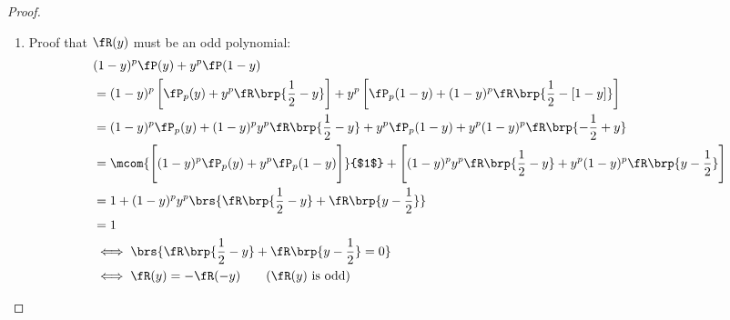 \begin{proof}
\begin{enumerate}
\begin{enumerate}
        \item Proof that $\fR(y)$ must be an odd polynomial:
          \begin{align*}
            &(1-y)^p \fP(y) + y^p \fP(1-y)
            \\&= (1-y)^p \left[ \fP_p(y)   + y^p     \fR\brp{\frac{1}{2}-y} \right] +
                     y^p \left[ \fP_p(1-y) + (1-y)^p \fR\brp{\frac{1}{2}-[1-y]} \right]
            \\&= (1-y)^p \fP_p(y)   + (1-y)^p y^p \fR\brp{\frac{1}{2}-y} +
                     y^p \fP_p(1-y) + y^p (1-y)^p \fR\brp{-\frac{1}{2}+y}
            \\&= \mcom{\Bigg[(1-y)^p \fP_p(y) + y^p \fP_p(1-y) \Bigg]}{$1$}  +
                 \Bigg[(1-y)^p y^p \fR\brp{\frac{1}{2}-y} +
                        y^p (1-y)^p \fR\brp{y-\frac{1}{2}}
                 \Bigg]
            \\&= 1+ (1-y)^p y^p \brs{\fR\brp{\frac{1}{2}-y} + \fR\brp{y-\frac{1}{2}}}
            \\&= 1
            \\&\iff \brs{\fR\brp{\frac{1}{2}-y} +\fR\brp{y-\frac{1}{2}}=0}
            \\&\iff \fR(y)=-\fR(-y) \qquad\text{($\fR(y)$ is odd)}
          \end{align*}
    \end{enumerate}


\end{enumerate}
\end{proof}
